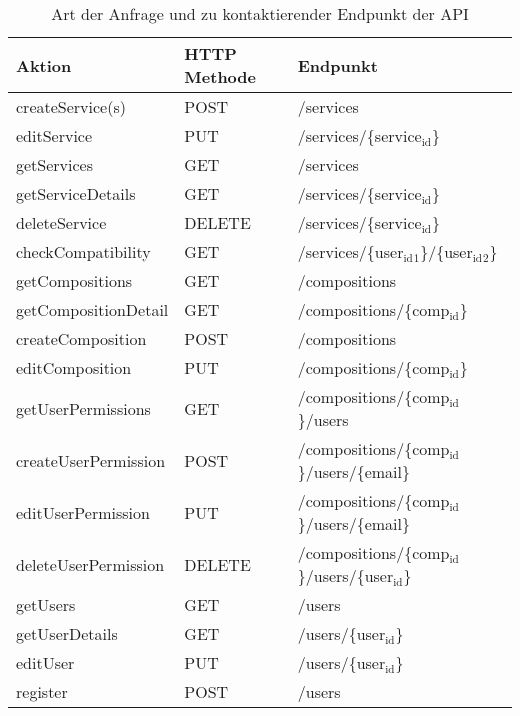 \documentclass[11pt]{article}
\begin{document}
\begin{table}[htbp]
\caption{Art der Anfrage und zu kontaktierender Endpunkt der API}
\centering
\begin{tabular}{lll}
Aktion & HTTP Methode & Endpunkt\\
\hline
createService(s) & POST & /services\\
editService & PUT & /services/\{service\(_{\text{id}}\)\}\\
getServices & GET & /services\\
getServiceDetails & GET & /services/\{service\(_{\text{id}}\)\}\\
deleteService & DELETE & /services/\{service\(_{\text{id}}\)\}\\
\hline
checkCompatibility & GET & /services/\{user\(_{\text{id}}\)\(_{\text{1}}\)\}/\{user\(_{\text{id}}\)\(_{\text{2}}\)\}\\
\hline
getCompositions & GET & /compositions\\
getCompositionDetail & GET & /compositions/\{comp\(_{\text{id}}\)\}\\
createComposition & POST & /compositions\\
editComposition & PUT & /compositions/\{comp\(_{\text{id}}\)\}\\
\hline
getUserPermissions & GET & /compositions/\{comp\(_{\text{id}}\)\}/users\\
createUserPermission & POST & /compositions/\{comp\(_{\text{id}}\)\}/users/\{email\}\\
editUserPermission & PUT & /compositions/\{comp\(_{\text{id}}\)\}/users/\{email\}\\
deleteUserPermission & DELETE & /compositions/\{comp\(_{\text{id}}\)\}/users/\{user\(_{\text{id}}\)\}\\
\hline
getUsers & GET & /users\\
getUserDetails & GET & /users/\{user\(_{\text{id}}\)\}\\
editUser & PUT & /users/\{user\(_{\text{id}}\)\}\\
register & POST & /users\\
\hline
\end{tabular}
\end{table}
\end{document}
